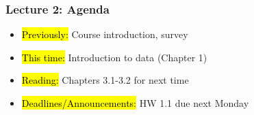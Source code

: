 
\begin{frame}
    \frametitle{Lecture 2: Agenda}
    \begin{itemize}
        \item \hl{Previously: }Course introduction, survey
        \item \hl{This time: }Introduction to data (Chapter 1)
        \item \hl{Reading: }Chapters 3.1-3.2 for next time
        \item \hl{Deadlines/Announcements: }HW 1.1 due next Monday
    \end{itemize}
    
\end{frame}
    